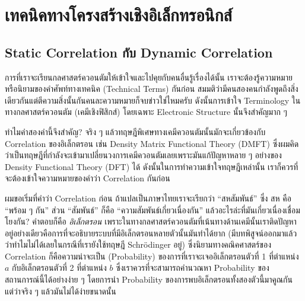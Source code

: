 

\chapter{เทคนิคทางโครงสร้างเชิงอิเล็กทรอนิกส์}
\label{ap:elec_struct_technique}

\section{Static Correlation กับ Dynamic Correlation}

การที่เราจะเรียนกลศาสตร์ควอนตัมให้เข้าใจและไปคุยกับคนอื่นรู้เรื่องได้นั้น เราจะต้องรู้ความหมายหรือนิยามของคำศัพท์ทางเทคนิค (Technical Terms) กันก่อน สมมติว่ามีคนสองคนกำลังพูดถึงสิ่งเดียวกันแต่ตีความสิ่งนั้นกันคนละความหมายก็จบข่าวใช่ไหมครับ ดังนั้นการเข้าใจ Terminology ในทางกลศาสตร์ควอนตัม (เคมีเชิงฟิสิกส์) โดยเฉพาะ Electronic Structure นั้นจึงสำคัญมาก ๆ

ทำไมคำสองคำนี้จึงสำคัญ? จริง ๆ แล้วทฤษฎีพิเศษทางเคมีควอนตัมนั้นมักจะเกี่ยวข้องกับ Correlation ของอิเล็กตรอน เช่น Density Matrix Functional Theory (DMFT) ซึ่งผมคิดว่าเป็นทฤษฎีที่กำลังจะเข้ามาเปลี่ยนวงการเคมีควอนตัมเลยเพราะมันแก้ปัญหาหลาย ๆ อย่างของ Density Functional Theory (DFT) ได้ ดังนั้นในการทำความเข้าใจทฤษฎีเหล่านั้น เราก็ควรที่จะต้องเข้าใจความหมายของคำว่า Correlation กันก่อน

ผมขอเริ่มที่คำว่า Correlation ก่อน ถ้าแปลเป็นภาษาไทยเราจะเรียกว่า \enquote{สหสัมพันธ์} ซึ่ง สห คือ \enquote{พร้อม ๆ กัน} ส่วน \enquote{สัมพันธ์} ก็คือ \enquote{ความสัมพันธ์เกี่ยวเนื่องกัน} แล้วอะไรล่ะที่มันเกี่ยวเนื่องเชื่อมโยงกัน? คำตอบก็คือ \textit{อิเล็กตรอน} เพราะในทางกลศาสตร์ควอนตัมที่เน้นทางด้านเคมีนั้นเราติดปัญหาอยู่อย่างเดียวคือการที่จะอธิบายระบบที่มีอิเล็กตรอนหลายตัวนั้นมันทำได้ยาก (มีบทพิสูจน์ออกมาแล้วว่าทำไมไม่ได้เลยในกรณีที่เรายังใช้ทฤษฎี Schr\"{o}dinger อยู่) ซึ่งนิยามทางคณิคศาสตร์ของ Correlation ก็คือความน่าจะเป็น (Probability) ของการที่เราจะเจออิเล็กตรอนตัวที่ 1 ที่ตำแหน่ง $a$ กับอิเล็กตรอนตัวที่ 2 ที่ตำแหน่ง $b$ ซึ่งเราควรที่จะสามารถคำนวณหา Probability ของสถานการณ์นี้ได้อย่างง่าย ๆ โดยการนำ Probability ของการพบอิเล็กตรอนทั้งสองตัวนี้มาคูณกัน แต่ว่าจริง ๆ แล้วมันไม่ได้ง่ายขนาดนั้น

